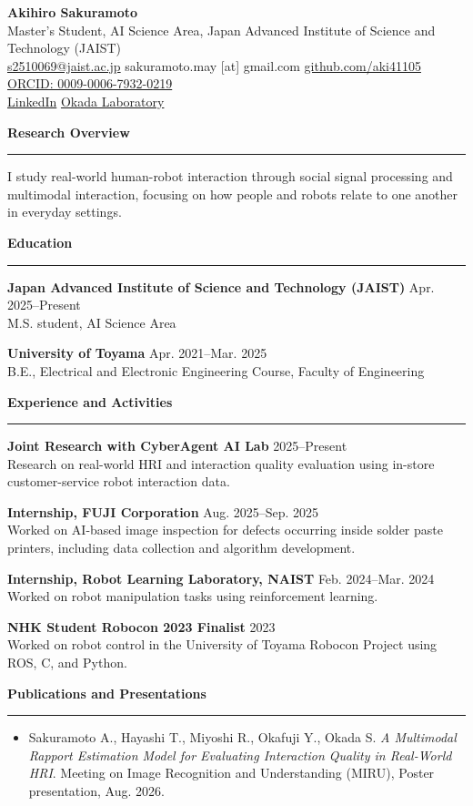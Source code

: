 \documentclass[10pt,a4paper]{article}
\newcommand{\cvsection}[1]{%
  \vspace{6pt}
  {\large\bfseries #1}\\[-2pt]
  \rule{\textwidth}{0.4pt}
  \vspace{2pt}
}
\newcommand{\entry}[3]{%
  \textbf{#1} \hfill #2\\
  #3
  \vspace{2pt}
}
\begin{document}
{\LARGE \textbf{Akihiro Sakuramoto}}\\
Master's Student, AI Science Area, Japan Advanced Institute of Science and Technology (JAIST)\\
\href{mailto:s2510069@jaist.ac.jp}{s2510069@jaist.ac.jp} \quad
sakuramoto.may [at] gmail.com \quad
\href{https://github.com/aki41105}{github.com/aki41105} \quad
\href{https://orcid.org/0009-0006-7932-0219}{ORCID: 0009-0006-7932-0219}\\
\href{https://www.linkedin.com/in/%E6%99%83%E5%BC%98-%E6%AB%BB%E6%9C%AC-37024b328/}{LinkedIn} \quad
\href{https://www.jaist.ac.jp/~okada-s/index.html}{Okada Laboratory}

\cvsection{Research Overview}
I study real-world human-robot interaction through social signal processing and multimodal interaction, focusing on how people and robots relate to one another in everyday settings.

\cvsection{Education}
\entry{Japan Advanced Institute of Science and Technology (JAIST)}{Apr. 2025--Present}
{M.S. student, AI Science Area}

\entry{University of Toyama}{Apr. 2021--Mar. 2025}
{B.E., Electrical and Electronic Engineering Course, Faculty of Engineering}

\cvsection{Experience and Activities}
\entry{Joint Research with CyberAgent AI Lab}{2025--Present}
{Research on real-world HRI and interaction quality evaluation using in-store customer-service robot interaction data.}

\entry{Internship, FUJI Corporation}{Aug. 2025--Sep. 2025}
{Worked on AI-based image inspection for defects occurring inside solder paste printers, including data collection and algorithm development.}

\entry{Internship, Robot Learning Laboratory, NAIST}{Feb. 2024--Mar. 2024}
{Worked on robot manipulation tasks using reinforcement learning.}

\entry{NHK Student Robocon 2023 Finalist}{2023}
{Worked on robot control in the University of Toyama Robocon Project using ROS, C, and Python.}

\cvsection{Publications and Presentations}
\begin{itemize}
  \item Sakuramoto A., Hayashi T., Miyoshi R., Okafuji Y., Okada S. \textit{A Multimodal Rapport Estimation Model for Evaluating Interaction Quality in Real-World HRI}. Meeting on Image Recognition and Understanding (MIRU), Poster presentation, Aug. 2026.
\end{itemize}
\end{document}
